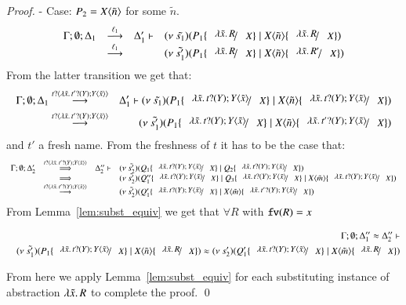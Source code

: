 \begin{proof}
	\noi - Case: $P_2 = X\langle \tilde{n} \rangle$ for some $\tilde{n}$.
%
	\[
	\begin{array}{rcll}
		\Gamma; \es; \Delta_1 &\by{\ell_1}& \Delta_1' \proves& \newsp{\tilde{s_1}}{P_1 \subst{\abs{\tilde{x}}{R}}{X} \Par \appl{X}{\tilde{n}} \subst{\abs{\tilde{x}}{R}}{X}}\\
		&\by{\ell_1} & & \newsp{\tilde{s_1'}}{P_1 \subst{\abs{\tilde{x}}{R}}{X} \Par \appl{X}{\tilde{n}} \subst{\abs{\tilde{x}}{R'}}{X}}
	\end{array}
	\]
%
	\noi From the latter transition we get that:
%
	\begin{eqnarray}
		\Gamma; \es; \Delta_1 &\by{\bactinp{t}{\abs{\tilde{x}}{\binp{t'}{Y} \appl{Y}{\tilde{x}}}}}& \Delta_1' \proves \newsp{\tilde{s_1}}{P_1 \subst{\abs{\tilde{x}}{\binp{t}{Y} \appl{Y}{\tilde{x}}}}{X} \Par \appl{X}{\tilde{n}} \subst{\abs{\tilde{x}}{\binp{t}{Y} \appl{Y}{\tilde{x}}}}{X}} \nonumber \\
		&\by{\bactinp{t}{\abs{\tilde{x}}{\binp{t'}{Y} \appl{Y}{\tilde{x}}}}}& 
		\newsp{\tilde{s_1'}}{P_1 \subst{\abs{\tilde{x}}{\binp{t}{Y} \appl{Y}{\tilde{x}}}}{X} \Par \appl{X}{\tilde{n}} \subst{\abs{\tilde{x}}{\binp{t'}{Y} \appl{Y}{\tilde{x}}}}{X}}
		\label{cor:subst_equiv5}
	\end{eqnarray}
%
	\noi and $t'$ a fresh name. From the freshness of $t$
	it has to be the case that:
%
\[
	\begin{array}{rcll}
		\Gamma; \es; \Delta_2' &\By{\bactinp{t}{\abs{\tilde{x}}{\binp{t'}{Y} \appl{Y}{\tilde{x}}}}}& \Delta_2'' \proves &
		\newsp{\tilde{s_2'}}{Q_1 \subst{\abs{\tilde{x}}{\binp{t}{Y} \appl{Y}{\tilde{x}}}}{X} \Par Q_2 \subst{\abs{\tilde{x}}{\binp{t}{Y} \appl{Y}{\tilde{x}}}}{X}}\\
		&\By{}& &
		\newsp{\tilde{s_2'}}{Q_1'' \subst{\abs{\tilde{x}}{\binp{t}{Y} \appl{Y}{\tilde{x}}}}{X} \Par Q_3 \subst{\abs{\tilde{x}}{\binp{t}{Y} \appl{Y}{\tilde{x}}}}{X} \Par \appl{X}{\tilde{m}} \subst{\abs{\tilde{x}}{\binp{t}{Y} \appl{Y}{\tilde{x}}}}{X}} \\
		&\by{\bactinp{t}{\abs{\tilde{x}}{\binp{t'}{Y} \appl{Y}{\tilde{x}}}}}& &
		\newsp{\tilde{s_2'}}{Q_1'\subst{\abs{\tilde{x}}{\binp{t}{Y} \appl{Y}{\tilde{x}}}}{X} \Par \appl{X}{\tilde{m}} \subst{\abs{\tilde{x}}{\binp{t'}{Y} \appl{Y}{\tilde{x}}}}{X}} \\
	\end{array}
\]
%
	\noi From Lemma~\ref{lem:subst_equiv} we get that $\forall R$ with $\mathtt{fv}(R) = x$

	\begin{eqnarray}
		&&\Gamma; \es; \Delta_1'' \wb \Delta_2'' \proves \nonumber \\
		&&\newsp{\tilde{s_1'}}{P_1 \subst{\abs{\tilde{x}}{\binp{t}{Y} \appl{Y}{\tilde{x}}}}{X} \Par \appl{X}{\tilde{n}} \subst{\abs{\tilde{x}}{R}}{X}} \wb \newsp{s_2'}{Q_1' \subst{\abs{\tilde{x}}{\binp{t}{Y} \appl{Y}{\tilde{x}}}}{X} \Par \appl{X}{\tilde{m}} \subst{\abs{\tilde{x}}{R}}{X}}
		\label{cor:subst_equiv6}
	\end{eqnarray} 

	\noi From here we apply Lemma~\ref{lem:subst_equiv} for each substituting instance of
	abstraction $\lambda \tilde{x}.\,R$ to complete the proof.
	\qed
\end{proof}

